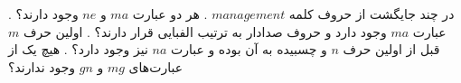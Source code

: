 \p
در چند جایگشت از حروف کلمه $management$
    .
    هر دو عبارت $ma$ و $ne$ وجود دارند؟
    .
    عبارت $ma$ وجود دارد و حروف صدادار به ترتیب الفبایی قرار دارند؟
    .
    اولین حرف $m$ قبل از اولین حرف $n$ و چسبیده به آن بوده و عبارت $na$ نیز وجود دارد؟
    .
    هیچ یک از عبارت‌های $mg$ و $gn$ وجود ندارند؟
  